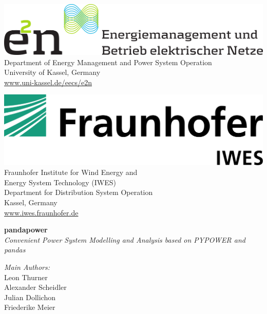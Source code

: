 \begin{titlepage}
\vspace*{1cm} 

\center
\begin{minipage}[t]{0.45\textwidth}
\includegraphics[width=1\textwidth]{../report/e2n.png}\\[1.5em]
Department of Energy Management and Power System Operation \\[0.5em]
University of Kassel, Germany \\[0.5em]
\href{url}{www.uni-kassel.de/eecs/e2n}
\end{minipage}\hfill
\begin{minipage}[t]{0.45\textwidth}
\includegraphics[width=.75\textwidth]{../report/IWES.png} \\[1em]
Fraunhofer Institute for Wind Energy and \\ Energy System Technology (IWES) \\[0.5em]
Department for Distribution System Operation \\[0.5em]
Kassel, Germany \\[0.5em]
\href{url}{www.iwes.fraunhofer.de}
\end{minipage}



\vfill
\large
\flushleft
\begin{minipage}{0.5\textwidth}
\textbf{pandapower}\\[0.5em]
\textit{Convenient Power System Modelling and Analysis based on PYPOWER and pandas}\\[2em]
\end{minipage}

\textit{Main Authors:}\\
Leon Thurner \\
Alexander Scheidler\\
Julian Dollichon\\
Friederike Meier\\[1em]


\end{titlepage}
